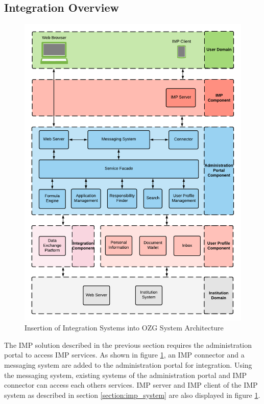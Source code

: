 \subsection{Integration Overview}

\begin{figure}[H]
    \centering
    \includegraphics[scale=0.6]{Diagrams/Integration Architecture 1/Technological Integration/1. Integration Overview.pdf}
    \caption{Insertion of Integration Systems into OZG System Architecture}
    \label{integration1:integration_overview}
\end{figure}

The IMP solution described in the previous section requires the administration portal to access IMP services. As shown in figure \ref{integration1:integration_overview}, an IMP connector and a messaging system are added to the administration portal for integration. Using the messaging system, existing systems of the administration portal and IMP connector can access each others services. IMP server and IMP client of the IMP system as described in section \ref{section:imp_system} are also displayed in figure \ref{integration1:integration_overview}.


